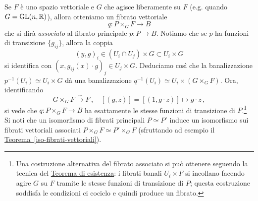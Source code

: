 Se $F$ è uno spazio vettoriale e $G$ che agisce liberamente su $F$ (e.g. quando $G = \mathrm{GL}(n,{\mathbb R})$),
allora otteniamo un fibrato vettoriale
\begin{equation*}
	q : P \times_{G} F \longrightarrow B
\end{equation*}
che si dirà \emph{associato} al fibrato principale $p:P \to B$.
Notiamo che se $p$ ha funzioni di transizione $\{g_{ij}\}$,
allora la coppia
\begin{equation*}
	(y,g)_{i} \in (U_{i} \cap U_{j}) \times G \subset U_{i} \times G
\end{equation*}
si identifica con $(x,g_{ij}(x) \cdot g)_{j} \in U_{j} \times G$.
Deduciamo così che la banalizzazione $p^{-1}(U_{i}) \simeq U_{i} \times G$
dà una banalizzazione $q^{-1}(U_{i}) \simeq U_{i} \times (G \times_{G} F)$.
Ora, identificando 
\begin{equation*}
	G \times_{G} F \xrightarrow{\sim} F\,, \quad
	[(g,z)] = [(1,g \cdot z)] \longmapsto g \cdot z\,,
\end{equation*}
si vede che $q:P \times_{G} F \to B$ ha esattamente le stesse funzioni di transizione di $P$.\footnote{Una costruzione alternativa del fibrato associato si può ottenere seguendo la tecnica del \hyperref[teo-esistenza-fibrato]{Teorema di esistenza}: i fibrati banali $U_{i} \times F$ si incollano facendo agire $G$ su $F$
tramite le stesse funzioni di transizione di $P$; questa costruzione soddisfa le condizioni ci cociclo e quindi produce un fibrato.} Si noti che un isomorfismo di fibrati principali $P \simeq P'$
induce un isomorfismo sui fibrati vettoriali associati 
$P \times_{G} F \simeq P' \times_{G} F$ 
(sfruttando ad esempio il \hyperref[iso-fibrati-vettoriali]{Teorema~\ref{iso-fibrati-vettoriali}}).



